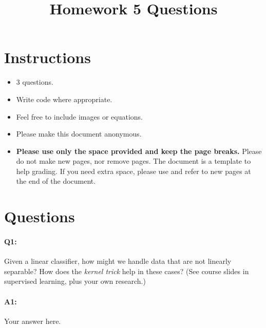 \title{\vspace{-1.5cm}Homework 5 Questions}



\maketitle
\vspace{-3cm}
\thispagestyle{fancy}

\section*{Instructions}
\begin{itemize}
  \item 3 questions.
  \item Write code where appropriate.
  \item Feel free to include images or equations.
  \item Please make this document anonymous.
  \item \textbf{Please use only the space provided and keep the page breaks.} Please do not make new pages, nor remove pages. The document is a template to help grading. If you need extra space, please use and refer to new pages at the end of the document.
\end{itemize}

\section*{Questions}

\paragraph{Q1:} Given a linear classifier, how might we handle data that are not linearly separable? How does the \emph{kernel trick} help in these cases? (See course slides in supervised learning, plus your own research.)

\paragraph{A1:} Your answer here.

